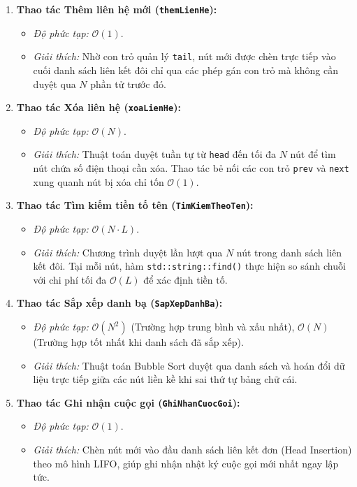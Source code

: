 \documentclass[12pt,a4paper]{report}
\begin{document}
\begin{enumerate}
    \item \textbf{Thao tác Thêm liên hệ mới (\texttt{themLienHe}):}
    \begin{itemize}
        \item \textit{Độ phức tạp:} $\mathcal{O}(1)$.
        \item \textit{Giải thích:} Nhờ con trỏ quản lý \texttt{tail}, nút mới được chèn trực tiếp vào cuối danh sách liên kết đôi chỉ qua các phép gán con trỏ mà không cần duyệt qua $N$ phần tử trước đó.
    \end{itemize}

    \item \textbf{Thao tác Xóa liên hệ (\texttt{xoaLienHe}):}
    \begin{itemize}
        \item \textit{Độ phức tạp:} $\mathcal{O}(N)$.
        \item \textit{Giải thích:} Thuật toán duyệt tuần tự từ \texttt{head} đến tối đa $N$ nút để tìm nút chứa số điện thoại cần xóa. Thao tác bẻ nối các con trỏ \texttt{prev} và \texttt{next} xung quanh nút bị xóa chỉ tốn $\mathcal{O}(1)$.
    \end{itemize}

    \item \textbf{Thao tác Tìm kiếm tiền tố tên (\texttt{TimKiemTheoTen}):}
    \begin{itemize}
        \item \textit{Độ phức tạp:} $\mathcal{O}(N \cdot L)$.
        \item \textit{Giải thích:} Chương trình duyệt lần lượt qua $N$ nút trong danh sách liên kết đôi. Tại mỗi nút, hàm \texttt{std::string::find()} thực hiện so sánh chuỗi với chi phí tối đa $\mathcal{O}(L)$ để xác định tiền tố.
    \end{itemize}

    \item \textbf{Thao tác Sắp xếp danh bạ (\texttt{SapXepDanhBa}):}
    \begin{itemize}
        \item \textit{Độ phức tạp:} $\mathcal{O}(N^2)$ (Trường hợp trung bình và xấu nhất), $\mathcal{O}(N)$ (Trường hợp tốt nhất khi danh sách đã sắp xếp).
        \item \textit{Giải thích:} Thuật toán Bubble Sort duyệt qua danh sách và hoán đổi dữ liệu trực tiếp giữa các nút liền kề khi sai thứ tự bảng chữ cái.
    \end{itemize}

    \item \textbf{Thao tác Ghi nhận cuộc gọi (\texttt{GhiNhanCuocGoi}):}
    \begin{itemize}
\item \textit{Độ phức tạp:} $\mathcal{O}(1)$.
        \item \textit{Giải thích:} Chèn nút mới vào đầu danh sách liên kết đơn (Head Insertion) theo mô hình LIFO, giúp ghi nhận nhật ký cuộc gọi mới nhất ngay lập tức.
    \end{itemize}
\end{enumerate}
\end{document}
